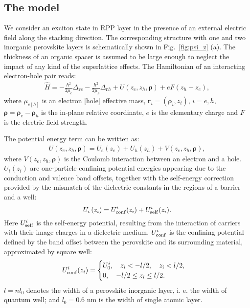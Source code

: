 \documentclass[prb,twocolumn,preprintnumbers,superscriptaddress]{revtex4}
\begin{document}
\subsection{The model}

We consider an exciton state in RPP layer in the presence of an external electric field along the stacking direction. 
The corresponding structure with one and two inorganic perovskite layers is schematically shown in Fig.~\eqref{fig:psi_z} (a).
The thickness of an organic spacer is assumed to be large enough to neglect the impact of any kind of the superlattice effects. 
The Hamiltonian of an interacting electron-hole pair reads:
%
\begin{align}
    \label{eq:Ham0}
    \hat{H} =   - \frac{\hbar^2}{2\mu _e}\Delta_{{\bm r} e} 
    - \frac{\hbar^2}{2\mu _h}\Delta_{ {\bm r}h} 
    + U\left( z_e,z_h,{\bm \rho} \right) +e F (z_h - z_e),
\end{align}
%
where $\mu_{e[h]}$ is an electron [hole] effective mass, ${\bm r}_i = \left( {\bm \rho}_i, z_i \right)$, $i = e,h$, 
${\bm \rho} = {\bm \rho}_e - {\bm \rho}_h$ is the in-plane relative coordinate,  
$e$ is the elementary charge 
and $F$ is the electric field strength.

The potential energy term can be written as:
%
\begin{align}
    \label{eq:U_rho}
    U\left( z_e,z_h, {\bm \rho}  \right) =
    U_e(z_e) + U_h(z_h) 
    + V\left( z_e ,z_h,{\bm \rho}  \right),
\end{align}
%
where $ V\left( z_e ,z_h,{\bm \rho}  \right)$ is the Coulomb interaction between an electron and a hole. ${U_i(z_i)}$ are one-particle confining potential energies appearing due to the conduction and valence band offsets, together with the self-energy correction provided by the mismatch of the dielectric constants in the regions of a barrier and a well: 
%
\begin{equation}
    \label{U_z}
    U_i\left( z_i \right) = U_{\rm conf}^i (z_i) + U_{\rm self}^i (z_i).
\end{equation}
%
Here ${U_{\rm self}^i}$
is the self-energy potential, resulting from the interaction of carriers with their image charges in a dielectric medium.
${U_{\rm conf}^i}$ is the confining potential defined by the band offset between the perovskite and its surrounding material, approximated by square well:
%
\begin{align}
    \label{eq:U_conf}
    U_{\rm conf}^i (z_i) =
    \begin{cases}
        U_0^i, \quad  z_i < -l/2, \quad z_i < l/2 ,  \\
        0, \quad -l/2 \leq z_i \leq l/2.
    \end{cases}
\end{align}
%
$l=n l_0$ denotes the width of a perovskite inorganic layer, i. e. the width of  quantum well; and $l_0= 0.6$ nm is the width of single atomic layer.
\end{document}
